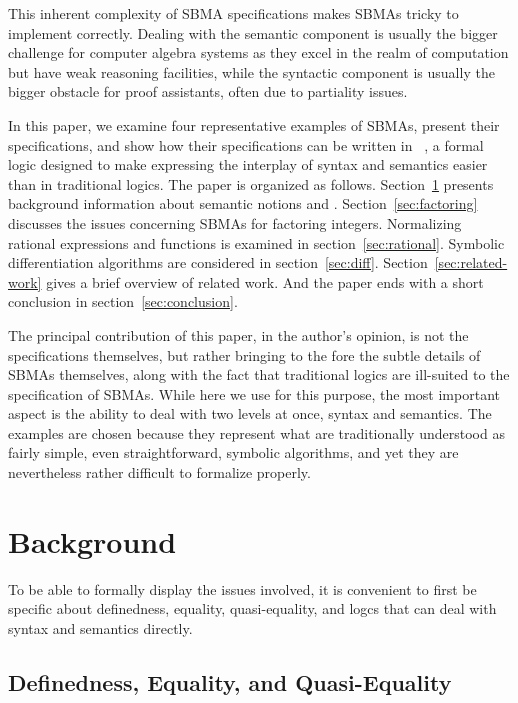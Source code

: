\documentclass[fleqn]{llncs}
\begin{document}
This inherent complexity of SBMA specifications makes SBMAs
tricky to implement correctly.  Dealing with the semantic component is usually
the bigger challenge for computer algebra systems as they excel in the
realm of computation but have weak reasoning facilities, while the syntactic
component is usually the bigger obstacle for proof assistants, often due
to partiality issues.

\bsp In this paper, we examine four representative examples of SBMAs,
present their specifications, and show how their specifications can be
written in {\churchuqe}~\cite{Farmer17}, a formal logic designed to
make expressing the interplay of syntax and semantics easier than in
traditional logics.  The paper is organized as follows.
Section~\ref{sec:background} presents background information about
semantic notions and {\churchuqe}.  Section~\ref{sec:factoring}
discusses the issues concerning SBMAs for factoring
integers. Normalizing rational expressions and functions is examined
in section~\ref{sec:rational}.  Symbolic differentiation algorithms
are considered in section~\ref{sec:diff}.
Section~\ref{sec:related-work} gives a brief overview of related work.
And the paper ends with a short conclusion in
section~\ref{sec:conclusion}.  \esp

The principal contribution of this paper, in the author's opinion, is
not the specifications themselves, but rather bringing to the fore the
subtle details of SBMAs themselves, along with the fact that traditional
logics are ill-suited to the specification of SBMAs.  While here we use
{\churchuqe} for this purpose, the most important aspect is the
ability to deal with two levels at once, syntax and semantics. The examples
are chosen because they represent what are traditionally understood as
fairly simple, even straightforward, symbolic algorithms, and yet they
are nevertheless rather difficult to formalize properly.

\section{Background}\label{sec:background}

To be able to formally display the issues involved, it is convenient
to first be specific about definedness, equality, quasi-equality,
and logcs that can deal with syntax and semantics directly.

\subsection{Definedness, Equality, and Quasi-Equality}
\end{document}
